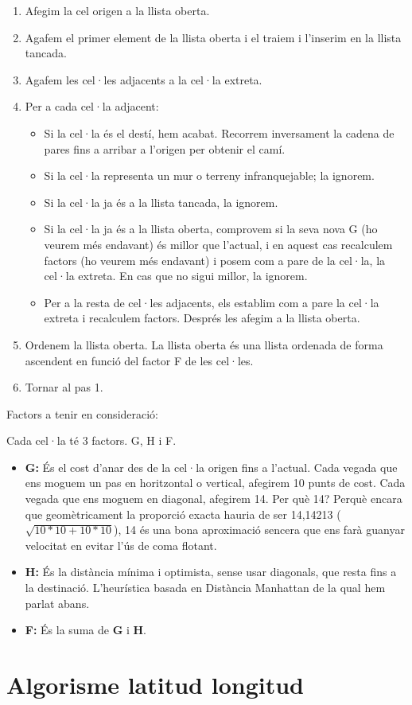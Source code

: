 \documentclass[12pt]{article}
\begin{document}
\begin{enumerate}
	\item Afegim la cel origen a la llista oberta.
	\item Agafem el primer element de la llista oberta i el traiem i l'inserim en la llista tancada.
	\item Agafem les cel·les adjacents a la cel·la extreta.
	\item Per a cada cel·la adjacent:
	\begin{itemize}
		\item Si la cel·la és el destí, hem acabat. Recorrem inversament la cadena de pares fins a arribar a l'origen per obtenir el camí.
		\item Si la cel·la representa un mur o terreny infranquejable; la ignorem.
		\item Si la cel·la ja és a la llista tancada, la ignorem.
		\item Si la cel·la ja és a la llista oberta, comprovem si la seva nova G (ho veurem més endavant) és millor que l'actual, i en aquest cas recalculem factors (ho veurem més endavant) i posem com a pare de la cel·la, la cel·la extreta. En cas que no sigui millor, la ignorem.
		\item Per a la resta de cel·les adjacents, els establim com a pare la cel·la extreta i recalculem factors. Després les afegim a la llista oberta.
	\end{itemize}
	\item Ordenem la llista oberta. La llista oberta és una llista ordenada de forma ascendent en funció del factor F de les cel·les.
	\item Tornar al pas 1.
\end{enumerate}

Factors a tenir en consideració:

Cada cel·la té 3 factors. G, H i F.

\begin{itemize}
	\item \textbf{G:} És el cost d'anar des de la cel·la origen fins a l'actual. Cada vegada que ens moguem un pas en horitzontal o vertical, afegirem 10 punts de cost. Cada vegada que ens moguem en diagonal, afegirem 14. Per què 14? Perquè encara que geomètricament la proporció exacta hauria de ser 14,14213 ($\sqrt{10 * 10 + 10 * 10}$), 14 és una bona aproximació sencera que ens farà guanyar velocitat en evitar l'ús de coma flotant.

	\item \textbf{H:} És la distància mínima i optimista, sense usar diagonals, que resta fins a la destinació. L'heurística basada en Distància Manhattan de la qual hem parlat abans.

	\item \textbf{F:} És la suma de \textbf{G} i \textbf{H}.
\end{itemize}

\clearpage
\section{Algorisme latitud longitud \label{ann:lat_lon}}

%


\end{document}
